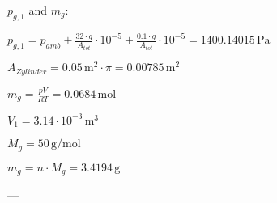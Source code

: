 \( p_{g,1} \) and \( m_g \):  

\( p_{g,1} = p_{amb} + \frac{32 \cdot g}{A_{tot}} \cdot 10^{-5} + \frac{0.1 \cdot g}{A_{tot}} \cdot 10^{-5} = 1400.14015 \, \text{Pa} \)  

\( A_{Zylinder} = 0.05 \, \text{m}^2 \cdot \pi = 0.00785 \, \text{m}^2 \)  

\( m_g = \frac{p V}{R T} = 0.0684 \, \text{mol} \)  

\( V_1 = 3.14 \cdot 10^{-3} \, \text{m}^3 \)  

\( M_g = 50 \, \text{g/mol} \)  

\( m_g = n \cdot M_g = 3.4194 \, \text{g} \)  

---